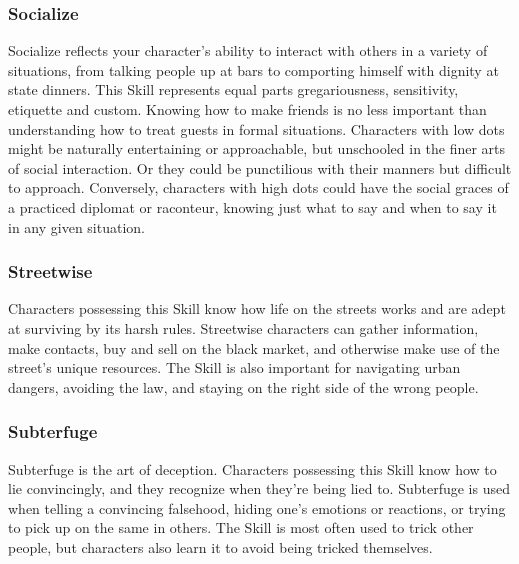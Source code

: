 \documentclass["../Misguided by Starlight.tex"]{subfiles}
\begin{document}
\subsubsection{Socialize}
Socialize reflects your character’s ability to interact with others in a variety of situations, from talking people up at bars to comporting himself with dignity at state dinners. This Skill represents equal parts gregariousness, sensitivity, etiquette and custom. Knowing how to make friends is no less important than understanding how to treat guests in formal situations. Characters with low dots might be naturally entertaining or approachable, but unschooled in the finer arts of social interaction. Or they could be punctilious with their manners but difficult to approach. Conversely, characters with high dots could have the social graces of a practiced diplomat or raconteur, knowing just what to say and when to say it in any given situation.

\subsubsection{Streetwise}
Characters possessing this Skill know how life on the streets works and are adept at surviving by its harsh rules. Streetwise characters can gather information, make contacts, buy and sell on the black market, and otherwise make use of the street’s unique resources. The Skill is also important for navigating urban dangers, avoiding the law, and staying on the right side of the wrong people.

\subsubsection{Subterfuge}
Subterfuge is the art of deception. Characters possessing this Skill know how to lie convincingly, and they recognize when they’re being lied to. Subterfuge is used when telling a convincing falsehood, hiding one’s emotions or reactions, or trying to pick up on the same in others. The Skill is most often used to trick other people, but characters also learn it to avoid being tricked themselves.
\end{document}
